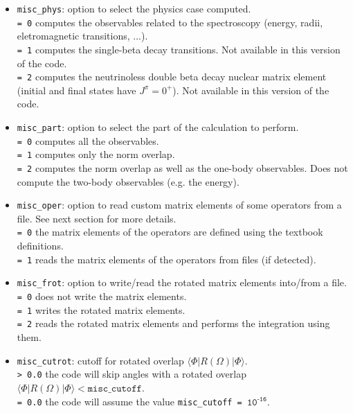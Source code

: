 \documentclass[a4paper,11pt]{article}
\newcommand{\ttt}[1]{\texttt{#1}}
\begin{document}
\begin{itemize}
 \item \ttt{misc\_phys}: option to select the physics case computed. \\[0.05cm]
  \ttt{= 0\:} computes the observables related to the spectroscopy (energy, radii, eletromagnetic transitions, $\ldots$). \\[0.05cm]
  \ttt{= 1\:} computes the single-beta decay transitions. Not available in this version of the code. \\[0.05cm]
  \ttt{= 2\:} computes the neutrinoless double beta decay nuclear matrix element (initial and final states have $J^\pi = 0^+$).
  Not available in this version of the code. 
 \item \ttt{misc\_part}: option to select the part of the calculation to perform. \\[0.05cm]
  \ttt{= 0\:} computes all the observables. \\[0.05cm]
  \ttt{= 1\:} computes only the norm overlap. \\[0.05cm]
  \ttt{= 2\:} computes the norm overlap as well as the one-body observables. Does not compute the two-body observables (e.g. the energy).
 \item \ttt{misc\_oper}: option to read custom matrix elements of some operators from a file. See next section for more details. \\[0.05cm]
  \ttt{= 0\:} the matrix elements of the operators are defined using the textbook definitions. \\[0.05cm]
  \ttt{= 1\:} reads the matrix elements of the operators from files (if detected).
 \item \ttt{misc\_frot}: option to write/read the rotated matrix elements into/from a file. \\[0.05cm]
  \ttt{= 0\:} does not write the matrix elements. \\[0.05cm]
  \ttt{= 1\:} writes the rotated matrix elements. \\[0.05cm]
  \ttt{= 2\:} reads the rotated matrix elements and performs the integration using them. 
 \item \ttt{misc\_cutrot}: cutoff for rotated overlap $\langle \Phi | R(\Omega) | \Phi \rangle$. \\[0.05cm]
  \ttt{> 0.0\:} the code will skip angles with a rotated overlap $\langle \Phi | R(\Omega) | \Phi \rangle < \ttt{misc\_cutoff}$.\\[0.05cm]
  \ttt{= 0.0\:} the code will assume the value \ttt{misc\_cutoff = ${\ttt{10}}^{\ttt{-16}}$}. 

\end{itemize}
\end{document}

